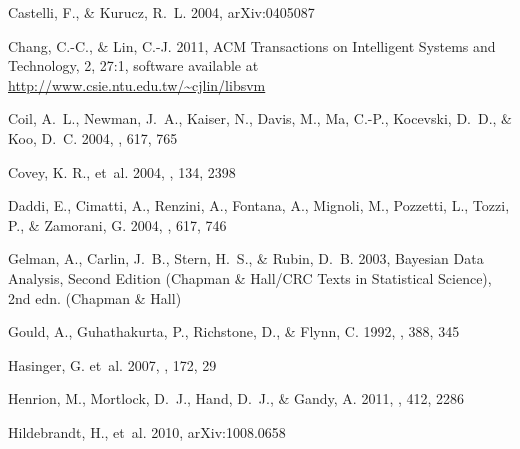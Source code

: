 \documentclass[12pt,preprint]{aastex}
\begin{document}
\begin{thebibliography}{44}
{Castelli}, F., \& {Kurucz}, R.~L. 2004, arXiv:0405087

Chang, C.-C., \& Lin, C.-J. 2011, ACM Transactions on Intelligent Systems and
  Technology, 2, 27:1, software available at
  \url{http://www.csie.ntu.edu.tw/~cjlin/libsvm}

{Coil}, A.~L., {Newman}, J.~A., {Kaiser}, N., {Davis}, M., {Ma}, C.-P.,
  {Kocevski}, D.~D., \& {Koo}, D.~C. 2004, \apj, 617, 765

{Covey}, K. R., {et~al.}  2004, \aj, 134, 2398


{Daddi}, E., {Cimatti}, A., {Renzini}, A., {Fontana}, A., {Mignoli}, M.,
  {Pozzetti}, L., {Tozzi}, P., \& {Zamorani}, G. 2004, \apj, 617, 746

Gelman, A., Carlin, J.~B., Stern, H.~S., \& Rubin, D.~B. 2003, Bayesian Data
  Analysis, Second Edition (Chapman \& Hall/CRC Texts in Statistical Science),
  2nd edn. (Chapman \& Hall)

{Gould}, A., {Guhathakurta}, P., {Richstone}, D., \& {Flynn}, C. 1992, \apj,
  388, 345

{Hasinger}, G. {et~al.} 2007, \apjs, 172, 29

{Henrion}, M., {Mortlock}, D.~J., {Hand}, D.~J., \& {Gandy}, A. 2011, \mnras,
  412, 2286

{Hildebrandt}, H., {et~al.} 2010, arXiv:1008.0658


\end{thebibliography}
\end{document}
